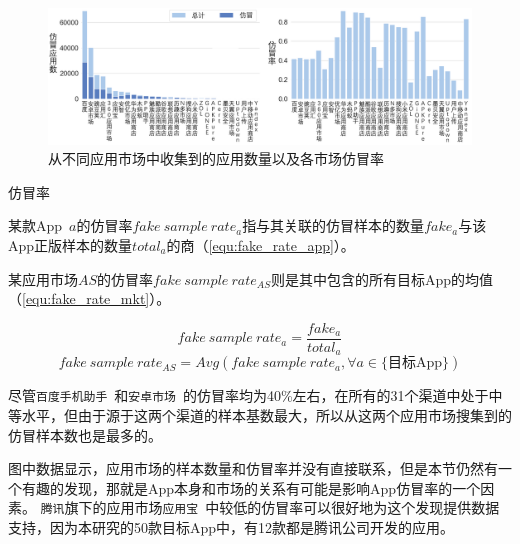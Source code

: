 \begin{figure}[htbp]
	\centering
  \setlength{\belowcaptionskip}{-10pt}
	\includegraphics[width=\textwidth]{./Figures/edwin-Number_of_samples_collected_markets_3.png}
	\caption{从不同应用市场中收集到的应用数量以及各市场仿冒率}
	\label{fig:Sample_source}
\end{figure}

\begin{Def}
    仿冒率

    某款App~$a$的仿冒率$fake~sample~rate_a$指与其关联的仿冒样本的数量$fake_a$与该App正版样本的数量$total_a$的商（\autoref{equ:fake_rate_app}）。

    某应用市场$AS$的仿冒率$fake~sample~rate_{AS}$则是其中包含的所有目标App的均值（\autoref{equ:fake_rate_mkt}）。
\end{Def}

\begin{equation}
    fake~sample~rate_a = \frac{fake_a}{total_a}
    \label{equ:fake_rate_app}
\end{equation}
\begin{equation}
    fake~sample~rate_{AS} = Avg(fake~sample~rate_a, \forall a \in \text{\{目标App\}})
    \label{equ:fake_rate_mkt}
\end{equation}
\vspace{0.5mm}

尽管\texttt{百度手机助手}~\cite{Baiduappstore}和\texttt{安卓市场}~\cite{Hiapk}的仿冒率均为40\%左右，在所有的31个渠道中处于中等水平，但由于源于这两个渠道的样本基数最大，所以从这两个应用市场搜集到的仿冒样本数也是最多的。

图中数据显示，应用市场的样本数量和仿冒率并没有直接联系，但是本节仍然有一个有趣的发现，那就是App本身和市场的关系有可能是影响App仿冒率的一个因素。
\texttt{腾讯}旗下的应用市场\texttt{应用宝}~\cite{Myapp}中较低的仿冒率可以很好地为这个发现提供数据支持，因为本研究的50款目标App中，有12款都是腾讯公司开发的应用。

